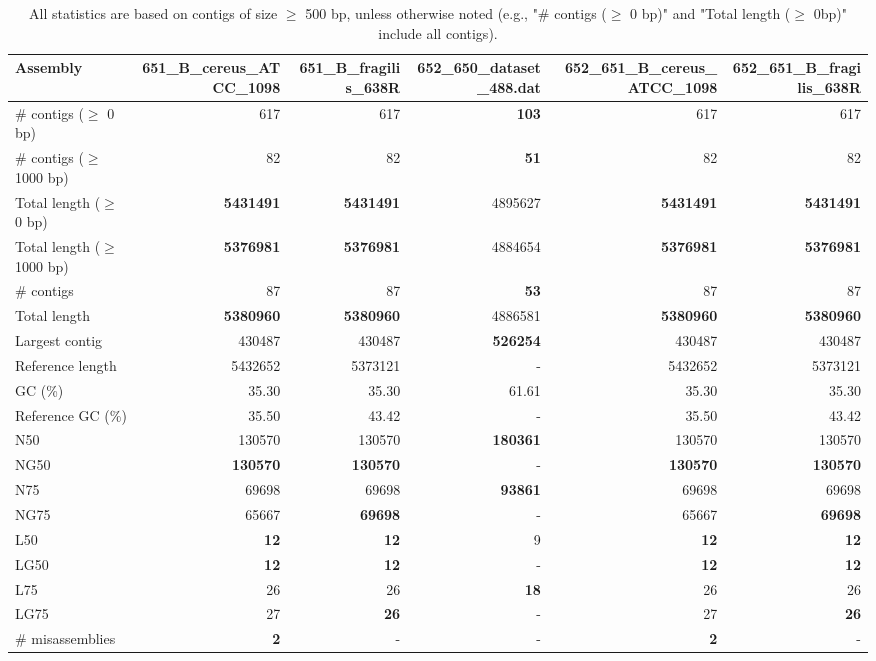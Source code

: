 \documentclass[12pt,a4paper]{article}
\begin{document}
\begin{table}[ht]
\begin{center}
\caption{All statistics are based on contigs of size $\geq$ 500 bp, unless otherwise noted (e.g., "\# contigs ($\geq$ 0 bp)" and "Total length ($\geq$ 0bp)" include all contigs).}
\begin{tabular}{|l*{5}{|r}|}
\hline
Assembly & 651\_B\_cereus\_ATCC\_1098 & 651\_B\_fragilis\_638R & 652\_650\_dataset\_488.dat & 652\_651\_B\_cereus\_ATCC\_1098 & 652\_651\_B\_fragilis\_638R \\ \hline
\# contigs ($\geq$ 0 bp) & 617 & 617 & {\bf 103} & 617 & 617 \\ \hline
\# contigs ($\geq$ 1000 bp) & 82 & 82 & {\bf 51} & 82 & 82 \\ \hline
Total length ($\geq$ 0 bp) & {\bf 5431491} & {\bf 5431491} & 4895627 & {\bf 5431491} & {\bf 5431491} \\ \hline
Total length ($\geq$ 1000 bp) & {\bf 5376981} & {\bf 5376981} & 4884654 & {\bf 5376981} & {\bf 5376981} \\ \hline
\# contigs & 87 & 87 & {\bf 53} & 87 & 87 \\ \hline
Total length & {\bf 5380960} & {\bf 5380960} & 4886581 & {\bf 5380960} & {\bf 5380960} \\ \hline
Largest contig & 430487 & 430487 & {\bf 526254} & 430487 & 430487 \\ \hline
Reference length & 5432652 & 5373121 & - & 5432652 & 5373121 \\ \hline
GC (\%) & 35.30 & 35.30 & 61.61 & 35.30 & 35.30 \\ \hline
Reference GC (\%) & 35.50 & 43.42 & - & 35.50 & 43.42 \\ \hline
N50 & 130570 & 130570 & {\bf 180361} & 130570 & 130570 \\ \hline
NG50 & {\bf 130570} & {\bf 130570} & - & {\bf 130570} & {\bf 130570} \\ \hline
N75 & 69698 & 69698 & {\bf 93861} & 69698 & 69698 \\ \hline
NG75 & 65667 & {\bf 69698} & - & 65667 & {\bf 69698} \\ \hline
L50 & {\bf 12} & {\bf 12} & 9 & {\bf 12} & {\bf 12} \\ \hline
LG50 & {\bf 12} & {\bf 12} & - & {\bf 12} & {\bf 12} \\ \hline
L75 & 26 & 26 & {\bf 18} & 26 & 26 \\ \hline
LG75 & 27 & {\bf 26} & - & 27 & {\bf 26} \\ \hline
\# misassemblies & {\bf 2} & - & - & {\bf 2} & - \\ \hline

\end{tabular}
\end{center}
\end{table}
\end{document}
